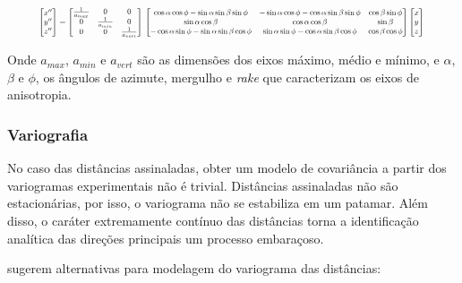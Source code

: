 \begin{equation}
\resizebox{.9 \textwidth}{!}{%
$
\begin{bmatrix} x'' \\ y'' \\ z'' \end{bmatrix} = \begin{bmatrix} \frac{1}{a_{max}} & 0 & 0 \\ 0 & \frac{1}{a_{min}} & 0 \\ 0 & 0 & \frac{1}{a_{vert}} \end{bmatrix} \\ \begin{bmatrix}\cos\alpha\cos\phi-\sin\alpha\sin\beta\sin\phi & -\sin\alpha\cos\phi-\cos\alpha\sin\beta\sin\phi & \cos\beta\sin\phi \\ \sin\alpha\cos\beta & \cos\alpha\cos\beta & \sin\beta \\ -\cos\alpha\sin\phi-\sin\alpha\sin\beta\cos\phi & \sin\alpha\sin\phi-\cos\alpha\sin\beta\cos\phi & \cos\beta\cos\phi \end{bmatrix} \begin{bmatrix} x \\ y \\ z \end{bmatrix}
$
}
\label{eq_rot_matrix}
\end{equation}

Onde $a_{max}$, $a_{min}$ e $a_{vert}$ são as dimensões dos eixos máximo, médio e mínimo, e $\alpha$, $\beta$ e $\phi$, os ângulos de azimute, mergulho e \textit{rake} que caracterizam os eixos de anisotropia.

\subsubsection{Variografia}

No caso das distâncias assinaladas, obter um modelo de covariância a partir dos variogramas experimentais não é trivial. Distâncias assinaladas não são estacionárias, por isso, o variograma não se estabiliza em um patamar. Além disso, o caráter extremamente contínuo das distâncias torna a identificação analítica das direções principais um processo embaraçoso.

 sugerem alternativas para modelagem do variograma das distâncias:

